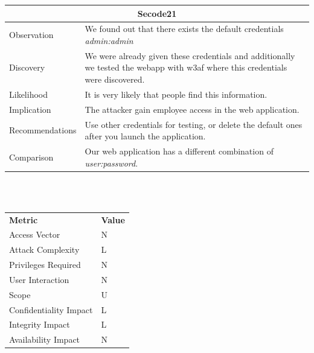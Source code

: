 \documentclass[headsepline,footsepline,footinclude=false,oneside,fontsize=11pt,paper=a4,listof=totoc,bibliography=totoc]{scrbook} %
\begin{document}
\begin{tabular}{ l|p{11cm}  }
	\hline
	\multicolumn{2}{c}{\textbf{Secode21}} \\
	\hline
	Observation   & We found out that there exists the default credentials \textit{admin:admin} \\
	Discovery  & We were already given these credentials and additionally we tested the webapp with
	w3af where this credentials were discovered.\\
	Likelihood & It is very likely that people find this information. \\
	Implication    & The attacker gain employee access in the web application. \\
	Recommendations & Use other credentials for testing, or delete the default ones after you launch the application. \\
	Comparison & Our web application has a different combination of \textit{user:password}.\\
	\hline
\end{tabular}
\\
\vspace{0.5cm}
\\
\begin{center}
	\begin{tabular}{ll}
		\rowcolor[HTML]{34CDF9}
		{\color[HTML]{ECF4FF} \textbf{Metric}}        & {\color[HTML]{ECF4FF} \textbf{Value}} \\
		\rowcolor[HTML]{BBDAFF}
		{\color[HTML]{333333} Access Vector}          & {\color[HTML]{333333} } N              \\
		\rowcolor[HTML]{ECF4FF}
		{\color[HTML]{333333} Attack Complexity}      & {\color[HTML]{333333} } L              \\
		\rowcolor[HTML]{BBDAFF}
		{\color[HTML]{333333} Privileges Required}    & {\color[HTML]{333333} } N              \\
		\rowcolor[HTML]{ECF4FF}
		{\color[HTML]{333333} User Interaction}       & {\color[HTML]{333333} } N              \\
		\rowcolor[HTML]{BBDAFF}
		{\color[HTML]{333333} Scope}                  & {\color[HTML]{333333} } U              \\
		\rowcolor[HTML]{ECF4FF}
		{\color[HTML]{333333} Confidentiality Impact} & {\color[HTML]{333333} } L              \\
		\rowcolor[HTML]{BBDAFF}
		{\color[HTML]{333333} Integrity Impact}       & {\color[HTML]{333333} } L              \\
		\rowcolor[HTML]{ECF4FF}
		{\color[HTML]{333333} Availability Impact}    & {\color[HTML]{333333} } N
	\end{tabular}
\end{center}
\end{document}
